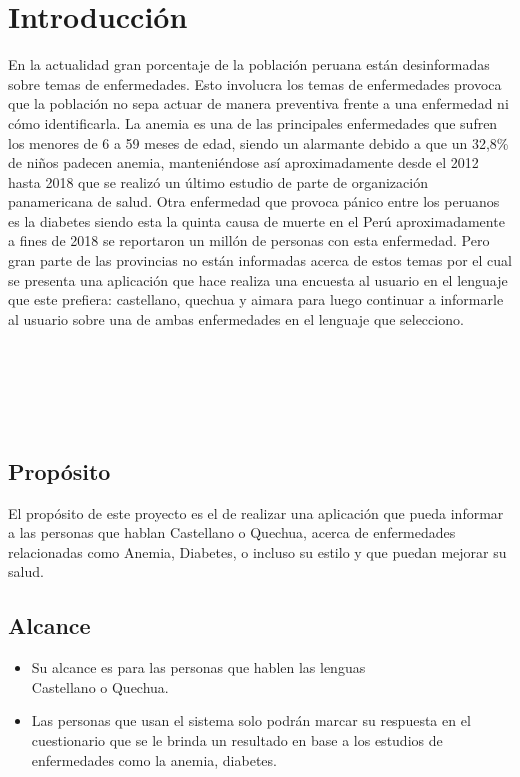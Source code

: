 \chapter{Introducción}
En la actualidad gran porcentaje de la población peruana están desinformadas sobre temas de enfermedades. Esto involucra los temas de enfermedades provoca que la población no sepa actuar de manera preventiva frente a una enfermedad ni cómo identificarla. La anemia es una de las principales enfermedades que sufren los menores de 6 a 59 meses de edad, siendo un alarmante debido a que un 32,8\% de niños padecen anemia, manteniéndose así aproximadamente desde el 2012 hasta 2018 que se realizó un último estudio de parte de organización panamericana de salud. Otra enfermedad que provoca pánico entre los peruanos es la diabetes siendo esta la quinta causa de muerte en el Perú aproximadamente a fines de 2018 se reportaron un millón de personas con esta enfermedad. Pero gran parte de las provincias no están informadas acerca de estos temas por el cual se presenta una aplicación que hace realiza una encuesta al usuario en el lenguaje que este prefiera: castellano, quechua y aimara para luego continuar a informarle al usuario sobre una de ambas enfermedades en el lenguaje que selecciono. 
\\
\\
\\
\\
\\
\\
\section{Propósito}
El propósito de este proyecto es el de realizar una aplicación que pueda informar a las personas que hablan Castellano o Quechua, acerca de enfermedades relacionadas como Anemia, Diabetes, o incluso su estilo y que puedan mejorar su salud.  
\section{Alcance}
\begin{itemize}
	\item Su alcance es para las personas que hablen las lenguas \\Castellano o Quechua.
	\item Las personas que usan el sistema solo podrán marcar su respuesta en el cuestionario que se le brinda un resultado en base a los estudios de enfermedades como la anemia, diabetes.
\end{itemize}

